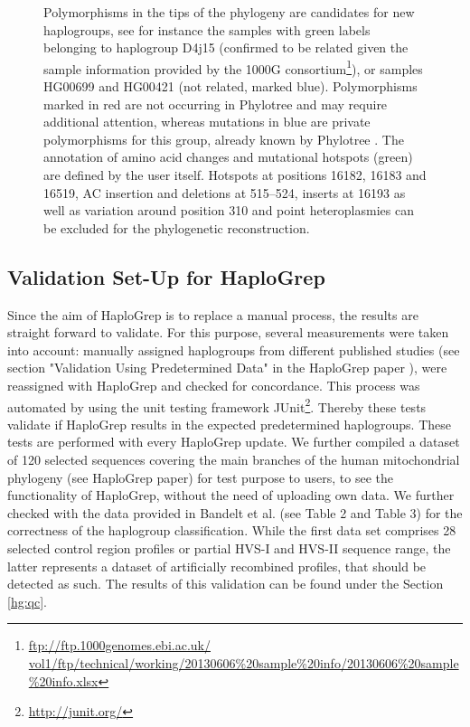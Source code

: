 \begin{enumerate}
\begin{figure}[!ht]
    \caption[Export of Graphical Phylogenetic Tree]{Polymorphisms in the tips of the phylogeny are candidates for new haplogroups, see for instance the samples with green labels belonging to haplogroup D4j15 (confirmed to be related given the sample information provided by the 1000G consortium\footnote{\url{ftp://ftp.1000genomes.ebi.ac.uk/ vol1/ftp/technical/working/20130606\%20sample\%20info/20130606\%20sample\%20info.xlsx}}), or samples HG00699 and HG00421 (not related, marked blue). Polymorphisms marked in red are not occurring in Phylotree and may require additional attention, whereas mutations in blue are private polymorphisms for this group, already known by Phylotree \cite{Weissensteiner2016a}. The annotation of amino acid changes and mutational hotspots (green) are defined by the user itself. Hotspots at positions 16182, 16183 and 16519, AC insertion and deletions at 515–524, inserts at 16193 as well as variation around position 310 and point heteroplasmies can be excluded for the phylogenetic reconstruction. } 
    \label{hg:phylogeneticTree}
\end{figure}
\end{enumerate}

\subsection{Validation Set-Up for HaploGrep}
Since the aim of HaploGrep is to replace a manual process, the results are straight forward to validate. For this purpose, several measurements were taken into account: manually assigned haplogroups from different published studies (see section "Validation Using Predetermined Data" in the HaploGrep paper \cite{Kloss-Brandstatter2011}), were reassigned with HaploGrep and checked for concordance. This process was automated by using the unit testing framework JUnit\footnote{\url{http://junit.org/}}. Thereby these tests validate if HaploGrep results in the expected predetermined haplogroups. These tests are performed with every HaploGrep update. We further compiled a dataset of 120 selected sequences covering the main branches of the human mitochondrial phylogeny (see HaploGrep paper) for test purpose to users, to see the functionality of HaploGrep, without the need of uploading own data. We further checked with the data provided in Bandelt et al. (see Table 2 and Table 3) \cite{Bandelt2012} for the correctness of the haplogroup classification. While the first data set comprises 28 selected control region profiles or partial HVS-I and HVS-II sequence range, the latter represents a dataset of artificially recombined profiles, that should be detected as such. The results of this validation can be found under the Section \ref{hg:qc}.


